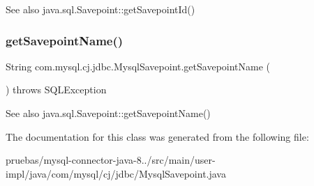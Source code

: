 \begin{DoxySeeAlso}{See also}
java.\+sql.\+Savepoint\+::get\+Savepoint\+Id() 
\end{DoxySeeAlso}
\mbox{\label{classcom_1_1mysql_1_1cj_1_1jdbc_1_1_mysql_savepoint_a1888db0eac58d2eb0d3394ea3c38d601}} 
\subsubsection{\texorpdfstring{get\+Savepoint\+Name()}{getSavepointName()}}
{\footnotesize\ttfamily String com.\+mysql.\+cj.\+jdbc.\+Mysql\+Savepoint.\+get\+Savepoint\+Name (\begin{DoxyParamCaption}{ }\end{DoxyParamCaption}) throws S\+Q\+L\+Exception}

\begin{DoxySeeAlso}{See also}
java.\+sql.\+Savepoint\+::get\+Savepoint\+Name() 
\end{DoxySeeAlso}


The documentation for this class was generated from the following file\+:\begin{DoxyCompactItemize}
\item 
pruebas/mysql-\/connector-\/java-\/8../src/main/user-\/impl/java/com/mysql/cj/jdbc/Mysql\+Savepoint.\+java\end{DoxyCompactItemize}
